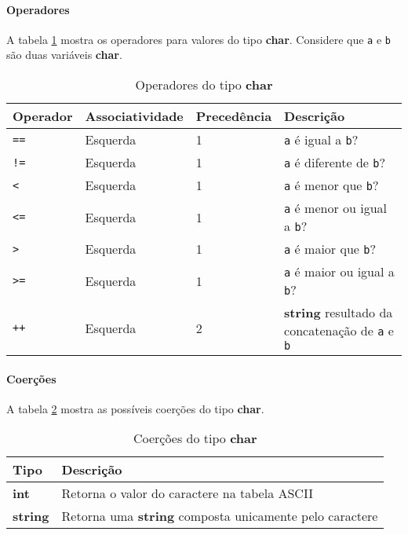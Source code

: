 \paragraph{Operadores}  A tabela \ref{tab:operadores-char} mostra os operadores para valores do tipo \textbf{char}. Considere que \texttt{a} e \texttt{b} são duas variáveis \textbf{char}.
\begin{table}[!h]
    \begin{tabular}{@{}llll@{}}
        \toprule
        Operador                 & Associatividade & Precedência & Descrição                                                    \\
        \midrule
        \texttt{==}              & Esquerda        & 1           & \texttt{a} é igual a \texttt{b}?                                                  \\
        \texttt{!=}              & Esquerda        & 1           & \texttt{a} é diferente de \texttt{b}?                                             \\
        \texttt{\textless{}}     & Esquerda        & 1           & \texttt{a} é menor que \texttt{b}?                                   \\
        \texttt{\textless{}=}    & Esquerda        & 1           & \texttt{a} é menor ou igual a \texttt{b}?                            \\
        \texttt{\textgreater{}}  & Esquerda        & 1           & \texttt{a} é maior que \texttt{b}?                                   \\
        \texttt{\textgreater{}=} & Esquerda        & 1           & \texttt{a} é maior ou igual a \texttt{b}?                            \\
        \texttt{++}              & Esquerda        & 2           & \textbf{string} resultado da concatenação de \texttt{a} e \texttt{b}
    \end{tabular}
    \caption{Operadores do tipo \textbf{char}}
    \label{tab:operadores-char}
\end{table}

\paragraph{Coerções} A tabela \ref{tab:coercoes-char} mostra as possíveis coerções do tipo \textbf{char}.
\begin{table}[!h]
    \begin{tabular}{@{}ll@{}}
        \toprule
        Tipo            & Descrição                                                      \\ \midrule
        \textbf{int}    & Retorna o valor do caractere na tabela ASCII                   \\
        \textbf{string} & Retorna uma \textbf{string} composta unicamente pelo caractere \\ \bottomrule
    \end{tabular}
    \caption{Coerções do tipo \textbf{char}}
    \label{tab:coercoes-char}
\end{table}

